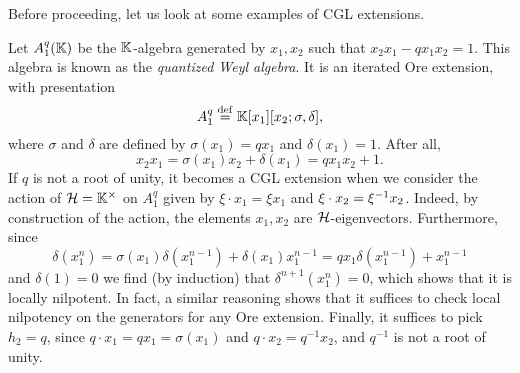 Before proceeding, let us look at some examples of CGL extensions.

\begin{example}
	Let $A_1^q(\mathbb{K})$ be the $\mathbb{K}$-algebra generated by $x_1, x_2$ such that $x_2 x_1 - q x_1 x_2 = 1$. This algebra is known as the \emph{quantized Weyl algebra}. It is an iterated Ore extension, with presentation
	\begin{equation*}
		A_1^q \overset{\mathrm{def}}{=} \mathbb{K}[x_1][x_2; \sigma, \delta],
	\end{equation*}
	where $\sigma$ and $\delta$ are defined by $\sigma(x_1) = q x_1$ and $\delta(x_1) = 1$.
	After all,
	\begin{equation*}
		x_2 x_1 = \sigma(x_1) x_2 + \delta(x_1) = q x_1 x_2 + 1.
	\end{equation*}
	If $q$ is not a root of unity, it becomes a CGL extension when we consider the action
	of $\mathcal{H} = \mathbb{K}^\times$ on $A_1^q$ given by $\xi \cdot x_1 = \xi x_1$ and $\xi \cdot
		x_2 = \xi^{-1} x_2$. Indeed, by construction of the action, the elements $x_1, x_2$ are
	$\mathcal{H}$-eigenvectors. Furthermore, since
	\begin{equation*}
		\delta(x_1^n) = \sigma(x_1)\delta(x_1^{n-1}) + \delta(x_1)x_1^{n-1} = q x_1 \delta(x_1^{n-1}) + x_1^{n-1}
	\end{equation*}
	and $\delta(1) = 0$ we find (by induction) that $\delta^{n+1}(x_1^n) = 0$, which shows
	that it is locally nilpotent. In fact, a similar reasoning shows that it suffices to
	check local nilpotency on the generators for any Ore extension. Finally, it suffices to
	pick $h_2 = q$, since $q \cdot x_1 = qx_1 = \sigma(x_1)$ and $q \cdot x_2 = q^{-1}x_2$,
	and $q^{-1}$ is not a root of unity.
\end{example}

